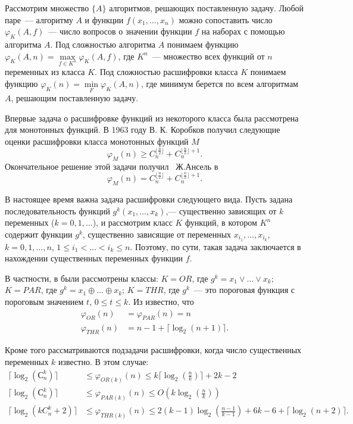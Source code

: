 \documentclass[oneside, final, 14pt]{extreport}
\begin{document}
	Рассмотрим множество $\{A\}$ алгоритмов, решающих поставленную задачу. Любой паре~--- алгоритму $A$ и функции $f(x_1, \ldots, x_n)$ 
	можно сопоставить число $\varphi_K(A,f)$~--- число вопросов о значении функции $f$ на наборах с помощью алгоритма $A$. Под сложностью  
	алгоритма $A$ понимаем функцию $\varphi_K(A,n) = \max\limits_{f \in K^n}\varphi_K(A, f)$, где $K^n$~--- множество всех функций от $n$ переменных
	из класса $K$. Под сложностью расшифровки класса $K$ понимаем функцию $\varphi_K(n) = \min\limits_F\varphi_K(A, n)$, где минимум берется по всем 
	алгоритмам $A$, решающим поставленную задачу.
	
	Впервые задача о расшифровке функций из некоторого класса была рассмотрена для монотонных функций. В 1963 году В. К. Коробков  \cite{korobkov}
	получил следующие оценки расшифровки класса монотонных функций $M$ 
	$$ \varphi_M(n) \geq C_n^{\lfloor \frac{n}{2} \rfloor} +  C_n^{\lfloor \frac{n}{2} \rfloor +1}.$$
	Окончательное решение этой задачи получил  Ж.Ансель в \cite{hansel}  
	$$ \varphi_M(n) = C_n^{\lfloor \frac{n}{2} \rfloor} +  C_n^{\lfloor \frac{n}{2} \rfloor +1}. $$

	В настоящее время важна задача расшифровки следующего вида. Пусть задана последовательность функций $g^k(x_1, \ldots, x_k)$,--- существенно 
	зависящих от $k$ переменных ($k = 0, 1, \ldots$), и рассмотрим класс $K$ функций, в котором $K^n$ содержит функции $g^k$, существенно зависящие  
	от переменных $x_{i_1}, \ldots, x_{i_k}$, $k = 0,1, \ldots, n$, $1 \leq i_1 < \ldots < i_k \leq n$. Поэтому, по сути, такая задача заключается в нахождении 
	существенных переменных функции $f$.
	
	В частности, в \cite{tokio} были рассмотрены классы: $K = OR$, где $g^k = x_1 \vee \ldots \vee x_k$; $K = PAR$, где $g^k = x_1 \oplus \ldots \oplus x_k$;
	$K = THR$, где $g^k$~--- это пороговая функция с пороговым значением $t$, $0 \leq t \leq k$. Из \cite{tokio} известно, что
	$$
	\begin{aligned}
		\varphi_{OR}(n) & = \varphi_{PAR}(n) = n \\
		\varphi_{THR}(n)&= n - 1 + \lceil \log_2(n+1) \rceil.
	\end{aligned} 
	$$
	
	Кроме того рассматриваются подзадачи расшифровки, когда число существенных переменных $k$ известно. В этом случае:
	$$
	\begin{aligned}
	       \lceil \log_2(С_n^k) \rceil & \leq \varphi_{OR(k)}(n) \leq k\lceil \log_2(\frac{n}{k}) \rceil + 2k - 2 \\
	        \lceil \log_2(С_n^k) \rceil & \leq \varphi_{PAR(k)}(n) \leq O(k\log_2(\frac{n}{k})) \\
	\lceil \log_2(kC_n^k + 2) \rceil & \leq \varphi_{THR(k)}(n) \leq 2(k-1)\log_2(\frac{n-1}{k-1}) + 6k - 6 + \lceil \log_2(n+2) \rceil.
	\end{aligned} 
	$$
	
\end{document}
